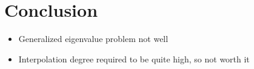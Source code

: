 \chapter{Conclusion}
\label{chp:6-conclusion}


\begin{itemize}
    \item Generalized eigenvalue problem not well
    \item Interpolation degree required to be quite high, so not worth it
\end{itemize}